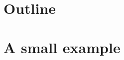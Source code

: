 \documentclass[compress]{beamer}\usepackage[]{graphicx}\usepackage[]{color}
\newenvironment{sframe}
{\begin{frame} [containsverbatim] }
  {\end{frame}}
\begin{document}










\section{Outline}
\label{sec:outline}


\section{A small example}
\label{sec:small}
\end{document}
